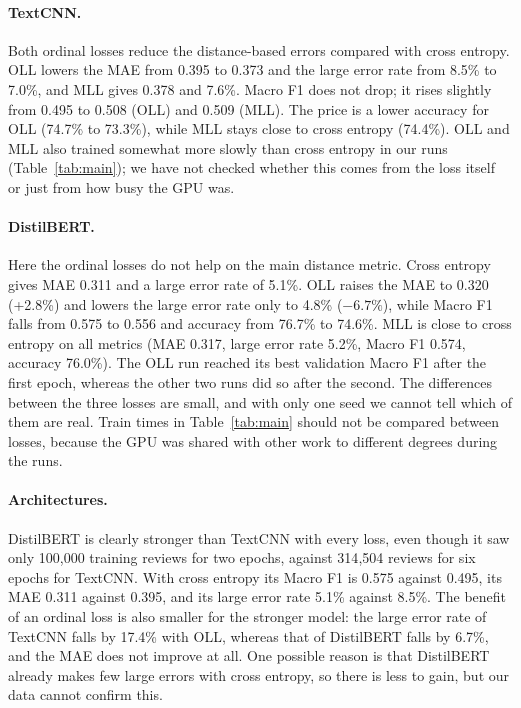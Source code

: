 \begin{table}[t]
\caption{Test results (seed 0; mean $\pm$ std once several seeds are available). Lower is better for MAE and large error rate; higher is better for accuracy and Macro F1. Train time is in minutes.}
\label{tab:main}
\centering

\end{table}

\paragraph{TextCNN.} Both ordinal losses reduce the distance-based errors compared with cross entropy. OLL lowers the MAE from 0.395 to 0.373 and the large error rate from 8.5\% to 7.0\%, and MLL gives 0.378 and 7.6\%. Macro F1 does not drop; it rises slightly from 0.495 to 0.508 (OLL) and 0.509 (MLL). The price is a lower accuracy for OLL (74.7\% to 73.3\%), while MLL stays close to cross entropy (74.4\%). OLL and MLL also trained somewhat more slowly than cross entropy in our runs (Table~\ref{tab:main}); we have not checked whether this comes from the loss itself or just from how busy the GPU was.

\paragraph{DistilBERT.} Here the ordinal losses do not help on the main distance metric. Cross entropy gives MAE 0.311 and a large error rate of 5.1\%. OLL raises the MAE to 0.320 (+2.8\%) and lowers the large error rate only to 4.8\% ($-6.7\%$), while Macro F1 falls from 0.575 to 0.556 and accuracy from 76.7\% to 74.6\%. MLL is close to cross entropy on all metrics (MAE 0.317, large error rate 5.2\%, Macro F1 0.574, accuracy 76.0\%). The OLL run reached its best validation Macro F1 after the first epoch, whereas the other two runs did so after the second. The differences between the three losses are small, and with only one seed we cannot tell which of them are real. Train times in Table~\ref{tab:main} should not be compared between losses, because the GPU was shared with other work to different degrees during the runs.

\paragraph{Architectures.} DistilBERT is clearly stronger than TextCNN with every loss, even though it saw only 100{,}000 training reviews for two epochs, against 314{,}504 reviews for six epochs for TextCNN. With cross entropy its Macro F1 is 0.575 against 0.495, its MAE 0.311 against 0.395, and its large error rate 5.1\% against 8.5\%. The benefit of an ordinal loss is also smaller for the stronger model: the large error rate of TextCNN falls by 17.4\% with OLL, whereas that of DistilBERT falls by 6.7\%, and the MAE does not improve at all. One possible reason is that DistilBERT already makes few large errors with cross entropy, so there is less to gain, but our data cannot confirm this.

